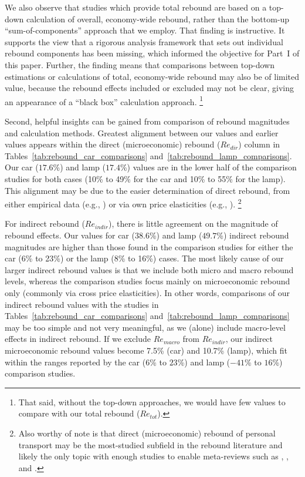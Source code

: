 \documentclass[12pt]{article}\usepackage[]{graphicx}\usepackage[]{xcolor}
\begin{document}
We also observe that studies which provide total rebound
are based on a top-down calculation of overall, economy-wide rebound,
rather than the bottom-up ``sum-of-components'' approach
that we employ.
That finding is instructive.
It supports the view that
a rigorous analysis framework that sets out individual rebound components
has been missing, which
informed the objective for Part~I of this paper.
Further, the finding means that
comparisons between top-down estimations or calculations
of total, economy-wide rebound
may also be of limited value,
because the rebound effects included or excluded may not be clear,
giving an appearance of a ``black box'' calculation approach.%
\footnote{
  That said, without the top-down approaches, 
  we would have few values to compare with our total rebound ($Re_{tot}$).
}

Second, helpful insights can be gained
from comparison of rebound magnitudes and calculation methods.
Greatest alignment between our values and earlier values
appears within the direct (microeconomic) rebound ($Re_{dir}$) column
in Tables~\ref{tab:rebound_car_comparisons} and~\ref{tab:rebound_lamp_comparisons}.
Our car ($17.6$\%) and lamp ($17.4$\%) values
are in the lower half of the comparison studies
for both cases (10\% to 49\% for the car and 10\% to 55\% for the lamp).
This alignment may be due to the easier determination
of direct rebound, from either empirical data
(e.g., \citet{Small:2007aa}) or
via own price elasticities (e.g., \citet{Chitnis:2015}).%
\footnote{
  Also worthy of note is that direct (microeconomic) rebound
  of personal transport may be the most-studied subfield
  in the rebound literature and likely the only topic with enough studies
  to enable meta-reviews such as
  \citet{Sorrell:2009aa},
  \citet{Dimitropoulos:2018aa}, and
  \citet{Gillingham:2020aa}.
}


For indirect rebound ($Re_{indir}$),
there is little agreement on the magnitude of rebound effects.
Our values for
car ($38.6$\%) and
lamp ($49.7$\%) indirect rebound magnitudes
are higher than those found in the comparison studies
for either the car (6\% to 23\%) or the lamp (8\% to 16\%) cases.
The most likely cause of our larger indirect rebound values
is that we include both micro and macro rebound levels,
whereas the comparison studies
focus mainly on microeconomic rebound only
(commonly via cross price elasticities).
In other words,
comparisons of our indirect rebound values with the studies
in Tables~\ref{tab:rebound_car_comparisons} and~\ref{tab:rebound_lamp_comparisons}
may be too simple and not very meaningful,
as we (alone) include macro-level effects in indirect rebound.
If we exclude $Re_{macro}$ from $Re_{indir}$,
our indirect microeconomic rebound values become
7.5\% (car) and
10.7\% (lamp),
which fit within the ranges reported by the
car ($6$\% to $23$\%) and lamp ($-41$\% to $16$\%)
comparison studies.
\end{document}
